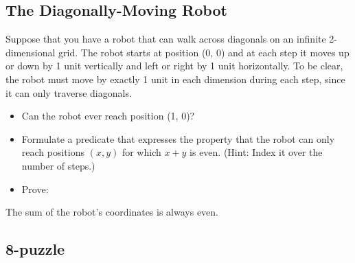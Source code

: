 \documentclass[12pt]{article}
\begin{document}
\subsection{The Diagonally-Moving Robot}

Suppose that you have a robot that can walk across diagonals on an infinite 2-dimensional grid. The robot starts at position (0, 0) and at each step it moves up or down by 1 unit vertically and left or right by 1 unit horizontally. To be clear, the robot must move by exactly 1 unit in each dimension during each step, since it can only traverse diagonals.

\begin{itemize}
    \item Can the robot ever reach position (1, 0)?
    \item Formulate a predicate that expresses the property that the robot can only reach positions $(x, y)$ for which
            $x + y$ is even. (Hint: Index it over the number of steps.)
    \item Prove:
\end{itemize}

\begin{theorem}
    The sum of the robot's coordinates is always even.
\end{theorem}


\clearpage
\subsection{8-puzzle}
\end{document}
